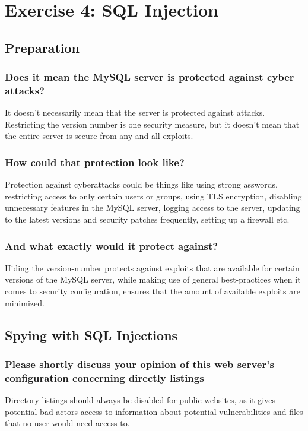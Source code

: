 \section{Exercise 4: SQL Injection}
\subsection{Preparation}
\subsubsection{Does it mean the MySQL server is protected against cyber attacks?}
It doesn't necessarily mean that the server is protected against attacks. Restricting the version number is one security measure, but it doesn't mean that the entire server is secure from any and all exploits.

\subsubsection{How could that protection look like?}
Protection against cyberattacks could be things like using strong asswords, restricting access to only certain users or groups, using TLS encryption, disabling unnecessary features in the MySQL server, logging access to the server, updating to the latest versions and security patches frequently, setting up a firewall etc.
\subsubsection{And what exactly would it protect against?}
Hiding the version-number protects against exploits that are available for certain versions of the MySQL server, while making use of general best-practices when it comes to security configuration, ensures that the amount of available exploits are minimized.

\subsection{Spying with SQL Injections}
\subsubsection{Please shortly discuss your opinion of this web server's configuration concerning directly listings}
Directory listings should always be disabled for public websites, as it gives potential bad actors access to information about potential vulnerabilities and files that no user would need access to.

